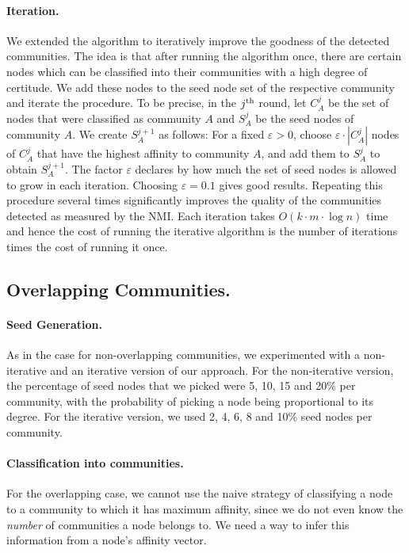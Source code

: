 \paragraph{Iteration.}
We extended the algorithm to iteratively improve the goodness of the detected communities.
The idea is that after running the algorithm once, there are certain nodes which can be classified 
into their communities with a high degree of certitude. We add these nodes to the seed node 
set of the respective community and iterate the procedure. To be precise, in the $j^{\textrm{th}}$ round, 
let $C^j_A$ be the set of nodes that were classified as community $A$ and $S^j_A$ 
be the seed nodes of community $A$. We create $S^{j+1}_A$ as follows: For a fixed $\varepsilon > 0$, 
choose $\varepsilon \cdot |C^j_A|$ nodes of $C^j_A$ that have the highest affinity to community $A$, 
and add them to $S^j_A$ to obtain $S^{j + 1}_A$. 
The factor $\varepsilon$ declares by how much the set of seed nodes is allowed to grow in each iteration. 
Choosing $\varepsilon = 0.1$ gives good results. Repeating this procedure several times significantly 
improves the quality of the communities detected as measured by the NMI. Each iteration takes 
$O(k \cdot m \cdot \log n)$ time and hence the cost of running the iterative algorithm is 
the number of iterations times the cost of running it once. 

\subsection{Overlapping Communities.}

\paragraph{Seed Generation.}
As in the case for non-overlapping communities, we experimented with a non-iterative 
and an iterative version of our approach. For the non-iterative version, the percentage 
of seed nodes that we picked were 5, 10, 15 and 20$\%$ per community, with the probability
of picking a node being proportional to its degree. For the iterative version, we used 
2, 4, 6, 8 and 10$\%$ seed nodes per community. 

\paragraph{Classification into communities.} For the overlapping case, we cannot
use the naive strategy of classifying a node to a community to which it has 
maximum affinity, since we do not even know the \emph{number} of communities a node belongs to. 
We need a way to infer this information from a node's affinity vector.

